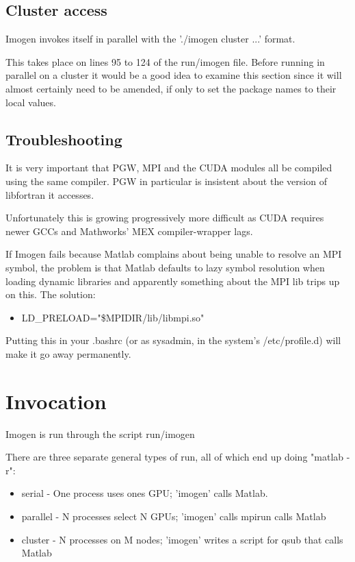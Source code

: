\documentclass[letterpaper,12pt]{article}
\begin{document}
\subsection{Cluster access}

Imogen invokes itself in parallel with the './imogen cluster ...' format.

This takes place on lines 95 to 124 of the run/imogen file. Before running
in parallel on a cluster it would be a good idea to examine this section since
it will almost certainly need to be amended, if only to set the package
names to their local values.

\subsection{Troubleshooting}

It is very important that PGW, MPI and the CUDA modules all be compiled
using the same compiler. PGW in particular is insistent about the version
of libfortran it accesses.

Unfortunately this is growing progressively more difficult as CUDA requires
newer GCCs and Mathworks' MEX compiler-wrapper lags.

If Imogen fails because Matlab complains about being unable to resolve an MPI
symbol, the problem is that Matlab defaults to lazy symbol resolution when
loading dynamic libraries and apparently something about the MPI lib trips
up on this. The solution:
\begin{itemize} \item LD\_PRELOAD="\$MPIDIR/lib/libmpi.so"
\end{itemize}
Putting this in your .bashrc (or as sysadmin, in the system's /etc/profile.d) will
make it go away permanently.

\section{Invocation}

Imogen is run through the script run/imogen

There are three separate general types of run, all of which end up doing "matlab -r":
\begin{itemize}
\item serial - One process uses ones GPU; 'imogen' calls Matlab.
\item parallel - N processes select N GPUs; 'imogen' calls mpirun calls Matlab
\item cluster - N processes on M nodes; 'imogen' writes a script for qsub that calls Matlab
\end{itemize}
\end{document}
